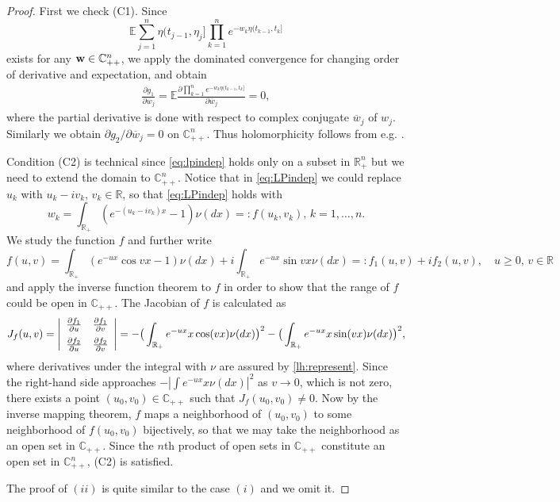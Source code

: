 \documentclass[11pt,leqno%
]{amsart}
\newcommand{\bfw}{{\bf w}}
\newcommand{\R}{\mathbb{R}}
\newcommand{\bbC}{{\mathbb C}}
\newcommand{\E }{{\mathbb E}}
\newcommand{\1}{{\mathbf 1}}
\begin{document}
\begin{proof}
First we check (C1). Since 
\[
 \E \sum_{j=1}^n \eta(t_{j-1},\eta_j] \prod_{k=1}^n e^{-w_k
 \eta(t_{k-1},t_k]} 
\]
exists for any $\bfw \in \bbC^n_{++}$, we apply  
the dominated convergence for changing order of derivative and expectation,
 and obtain 
\begin{align*}
 \frac{\partial g_1}{\partial \overline w_j} = \E\frac{ \partial
  \prod_{k=1}^n e^{-w_k \eta(t_{k-1},t_k]}}{\partial \overline w_j}=0,
\end{align*}
where the partial derivative is done with respect to complex conjugate
 $\overline{w}_j$ of $w_j$. Similarly we obtain $\partial g_2/ \partial
 \overline{w}_j=0$ on $\bbC^n_{++}$. Thus holomorphicity follows
 from e.g. \cite[Theorems 3.8 and 6.2, Ch.1]{grauert:fritzsche:1976}. 

 Condition (C2) is technical since \eqref{eq:lpindep} holds only on
 a subset in $\R^n_+$ but we need to extend the domain to
 $\bbC^n_{++}$. Notice that in 
 \eqref{eq:LPindep} we could replace $u_k$ with $u_k-iv_k,\,v_k\in \R$,
 so that \eqref{eq:LPindep} holds with 
 \[
  w_k = \int_{\R_+}(e^{-(u_k-iv_k)x}-1)\nu(dx)=: f(u_k,v_k),\,k=1,\ldots,n.
 \]
 We study the function $f$ and further write 
 \[
  f(u,v) = \int_{\R_+} (e^{-ux}\cos vx-1)\nu(dx) +i \int_{\R_+} e^{-ux}\sin vx
 \nu(dx)=: f_1(u,v)+if_2(u,v),\quad u\ge 0,\,v\in \R
 \]
 and apply the inverse function theorem to $f$ in order to show that 
 the range of $f$ could be open in $\bbC_{++}$. The Jacobian of $f$ is
 calculated as 
 \begin{align*}
  J_f(u,v)= \left|
 \begin{array}{cc}
  \frac{\partial f_1}{\partial u} & \frac{\partial f_1}{\partial v} \vspace{2mm}\\
  \frac{\partial f_2}{\partial u} & \frac{\partial f_2}{\partial v}
 \end{array}
\right| = -\big( 
\int_{\R_+} e^{-ux}x\cos (vx)\nu(dx)
 \big)^2 -\big( 
\int_{\R_+} e^{-ux}x\sin (vx)\nu(dx)
 \big)^2, 
 \end{align*}
where derivatives under the integral with $\nu$ are assured by
 \eqref{lh:represent}. Since the
 right-hand side approaches $-|\int e^{-ux}x \nu(dx)|^2$ as $v\to0$,
 which is not zero, 
 there exists a point $(u_0,v_0)\in \bbC_{++}$ such that $J_f(u_0,v_0)\neq
 0$. Now by the inverse mapping theorem, $f$ maps a neighborhood of
 $(u_0,v_0)$ to some neighborhood of $f(u_0,v_0)$ bijectively, so that
 we may take the neighborhood as an open set in $\bbC_{++}$. 
 Since the $n$th product of open sets in $\bbC_{++}$ constitute an open
 set in $\bbC_{++}^n$, (C2) is satisfied. 

The proof of $(ii)$ is quite similar to the case $(i)$ and we omit it. 
\end{proof}
\end{document}
